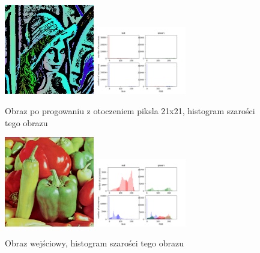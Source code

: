 \documentclass[final,a4paper,openany,12pt]{mwbk}
\begin{document}
\begin{figure}[H]
	\begin{center}
		\includegraphics[width=0.35\textwidth]{lena_color_locThreshold_result}
		\includegraphics[width=0.35\textwidth]{lena_color_locThreshold_histogram}
	\end{center}
	\caption{Obraz po progowaniu z otoczeniem piksla 21x21, histogram szarości tego obrazu}
\end{figure}

\begin{figure}[H]
	\begin{center}
		\includegraphics[width=0.35\textwidth]{peppers_color}
		\includegraphics[width=0.35\textwidth]{peppers_color_histogram}
	\end{center}
	\caption{Obraz wejściowy, histogram szarości tego obrazu}
\end{figure}
\end{document}
